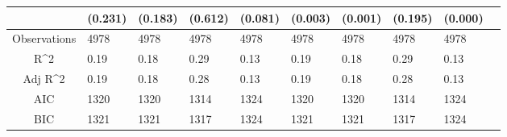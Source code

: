 \documentclass{article}
\begin{document}
\begin{table}[H]
\begin{tabular}{|clllllllll|}
   & (0.231) & (0.183) & (0.612) & (0.081) & (0.003) & (0.001) & (0.195) & (0.000) & \\ 
  \hline 
 Observations & 4978 & 4978 & 4978 & 4978 & 4978 & 4978 & 4978 & 4978 & \\ 
  R^2 & 0.19 & 0.18 & 0.29 & 0.13 & 0.19 & 0.18 & 0.29 & 0.13 & \\ 
  Adj R^2 & 0.19 & 0.18 & 0.28 & 0.13 & 0.19 & 0.18 & 0.28 & 0.13 & \\ 
  AIC & 1320 & 1320 & 1314 & 1324 & 1320 & 1320 & 1314 & 1324 & \\ 
  BIC & 1321 & 1321 & 1317 & 1324 & 1321 & 1321 & 1317 & 1324 & \\ 
   \hline
\end{tabular}
 
\end{table}
\end{document}
